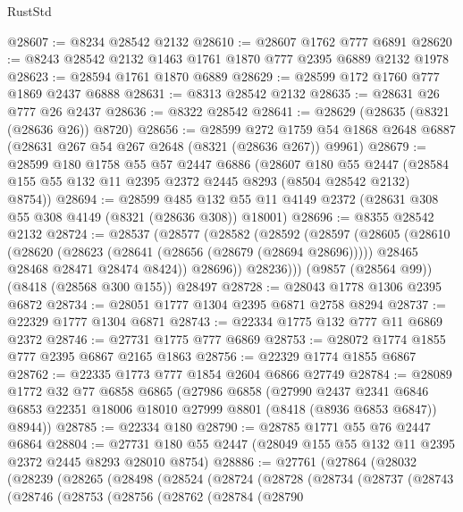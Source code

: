 \begin{lexlean}{RustStd}
\begin{coremodule}
@28607 := @8234 @28542 @2132
@28610 := @28607 @1762 @777 @6891
@28620 := @8243 @28542 @2132 @1463 @1761 @1870 @777 @2395 @6889 @2132 @1978
@28623 := @28594 @1761 @1870 @6889
@28629 := @28599 @172 @1760 @777 @1869 @2437 @6888
@28631 := @8313 @28542 @2132
@28635 := @28631 @26 @777 @26 @2437
@28636 := @8322 @28542
@28641 := @28629 (@28635 (@8321 (@28636 @26)) @8720)
@28656 := @28599
    @272
    @1759
    @54
    @1868
    @2648
    @6887
    (@28631 @267 @54 @267 @2648 (@8321 (@28636 @267)) @9961)
@28679 := @28599
    @180
    @1758
    @55
    @57
    @2447
    @6886
    (@28607
      @180
      @55
      @2447
      (@28584 @155 @55 @132 @11 @2395 @2372 @2445 @8293 (@8504 @28542 @2132) @8754))
@28694 := @28599
    @485
    @132
    @55
    @11
    @4149
    @2372
    (@28631 @308 @55 @308 @4149 (@8321 (@28636 @308)) @18001)
@28696 := @8355 @28542 @2132
@28724 := @28537
    (@28577
      (@28582
        (@28592
          (@28597
            (@28605
              (@28610
                (@28620
                  (@28623 (@28641 (@28656 (@28679 (@28694 @28696)))))
                  @28465
                  @28468
                  @28471
                  @28474
                  @8424))
              @28696))
          @28236)))
    (@9857 (@28564 @99))
    (@8418 (@28568 @300 @155))
    @28497
@28728 := @28043 @1778 @1306 @2395 @6872
@28734 := @28051 @1777 @1304 @2395 @6871 @2758 @8294
@28737 := @22329 @1777 @1304 @6871
@28743 := @22334 @1775 @132 @777 @11 @6869 @2372
@28746 := @27731 @1775 @777 @6869
@28753 := @28072 @1774 @1855 @777 @2395 @6867 @2165 @1863
@28756 := @22329 @1774 @1855 @6867
@28762 := @22335 @1773 @777 @1854 @2604 @6866 @27749
@28784 := @28089
    @1772
    @32
    @77
    @6858
    @6865
    (@27986
      @6858
      (@27990
        @2437
        @2341
        @6846
        @6853
        @22351
        @18006
        @18010
        @27999
        @8801
        (@8418 (@8936 @6853 @6847))
        @8944))
@28785 := @22334 @180
@28790 := @28785 @1771 @55 @76 @2447 @6864
@28804 := @27731 @180 @55 @2447 (@28049 @155 @55 @132 @11 @2395 @2372 @2445 @8293 @28010 @8754)
@28886 := @27761
    (@27864
      (@28032
        (@28239
          (@28265
            (@28498
              (@28524
                (@28724
                  (@28728
                    (@28734
                      (@28737
                        (@28743
                          (@28746
                            (@28753
                              (@28756
                                (@28762
                                  (@28784
                                    (@28790

\end{coremodule}
\end{lexlean}
